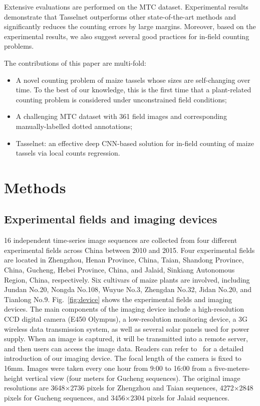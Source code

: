 \documentclass[twocolumn]{bmcart}%
\begin{document}
Extensive evaluations are performed on the MTC dataset. Experimental results demonstrate that Tasselnet outperforms other state-of-the-art methods and significantly reduces the counting errors by large margins. Moreover, based on the experimental results, we also suggest several good practices for in-field counting problems.

The contributions of this paper are multi-fold:
\begin{itemize}
	\item A novel counting problem of maize tassels whose sizes are self-changing over time. To the best of our knowledge, this is the first time that a plant-related counting problem is considered under unconstrained field conditions;
	\item A challenging MTC dataset with 361 field images and corresponding manually-labelled dotted annotations;
	\item Tasselnet: an effective deep CNN-based solution for in-field counting of maize tassels via local counts regression.
\end{itemize}

\section*{Methods}
%

\subsection*{Experimental fields and imaging devices}
%
16 independent time-series image sequences are collected from four different experimental fields across China between 2010 and 2015. Four experimental fields are located in Zhengzhou, Henan Province, China, Taian, Shandong Province, China, Gucheng, Hebei Province, China, and Jalaid, Sinkiang Autonomous Region, China, respectively. Six cultivars of maize plants are involved, including Jundan No.20, Nongda No.108, Wuyue No.3, Zhengdan No.32, Jidan No.20, and Tianlong No.9. Fig.~\ref{fig:device} shows the experimental fields and imaging devices. The main components of the imaging device include a high-resolution CCD digital camera (E450 Olympus), a low-resolution monitoring device, a 3G wireless data transmission system, as well as several solar panels used for power supply. When an image is captured, it will be transmitted into a remote server, and then users can access the image data. Readers can refer to~\cite{lu2016toward} for a detailed introduction of our imaging device. The focal length of the camera is fixed to 16mm. Images were taken every one hour from 9:00 to 16:00 from a
five-meters-height vertical view (four meters for Gucheng sequences). The original image resolutions are 3648$\times$2736 pixels for Zhengzhou and Taian sequences, 4272$\times$2848 pixels for Gucheng sequences, and 3456$\times$2304 pixels for Jalaid sequences.
\end{document}
